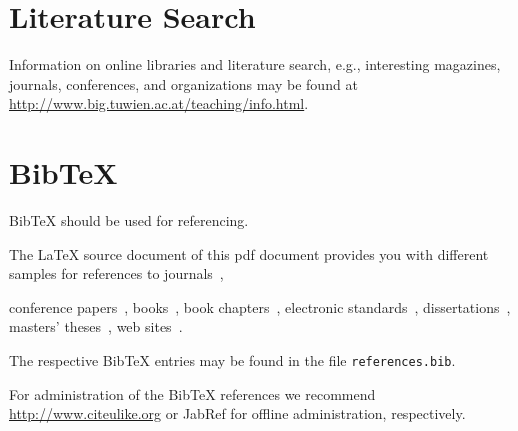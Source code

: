 \section{Literature Search}

Information on online libraries and literature search, e.g., interesting magazines, journals, conferences, and organizations may be found at
\url{http://www.big.tuwien.ac.at/teaching/info.html}.

\section{BibTeX}

BibTeX should be used for referencing.

The LaTeX source document of this pdf document provides you with different samples for references to journals~\cite{jour:B2BServices},

conference papers~\cite{proc:TheWebMLApproach},
books~\cite{book:umlatwork},
book chapters~\cite{incoll:ErhardKonrad1992},
electronic standards~\cite{man:BPEL},
dissertations~\cite{phdthesis:manuelWimmer},
masters' theses~\cite{mast:AUMLProfile},
web sites~\cite{misc:BIGWebsite}.

The respective BibTeX entries may be found in the file \texttt{references.bib}.

For administration of the BibTeX references we recommend \url{http://www.citeulike.org} or JabRef for offline administration, respectively.
